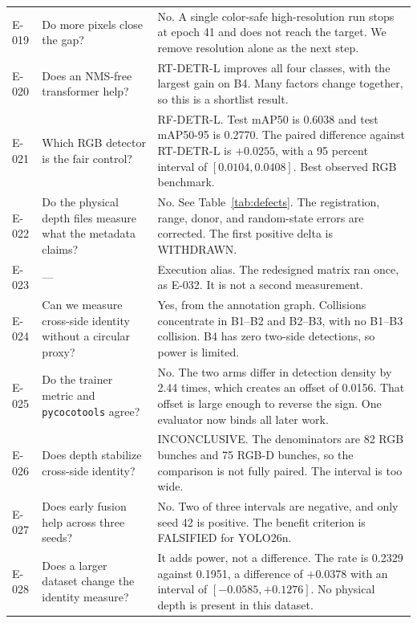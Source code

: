 \documentclass[preprint,12pt]{elsarticle}
\newcommand{\E}[1]{E-#1}
\newcommand{\mAP}{mAP}
\begin{document}
\begin{longtable}{L{0.07\textwidth}L{0.28\textwidth}L{0.55\textwidth}}
\E{019} & Do more pixels close the gap? & No. A single color-safe
high-resolution run stops at epoch 41 and does not reach the target. We remove resolution alone as the
next step.\\

\E{020} & Does an NMS-free transformer help? & RT-DETR-L improves all four
classes, with the largest gain on B4. Many factors change together, so this is a
shortlist result.\\

\E{021} & Which RGB detector is the fair control? & RF-DETR-L. Test \mAP50 is
0.6038 and test \mAP50-95 is 0.2770. The paired difference against RT-DETR-L is
$+0.0255$, with a 95 percent interval of $[0.0104, 0.0408]$. Best observed RGB
benchmark.\\

\E{022} & Do the physical depth files measure what the metadata claims? & No.
See Table~\ref{tab:defects}. The registration, range, donor, and random-state
errors are corrected. The first positive delta is WITHDRAWN.\\

\E{023} & --- & Execution alias. The redesigned matrix ran once, as \E{032}. It
is not a second measurement.\\

\E{024} & Can we measure cross-side identity without a circular proxy? & Yes,
from the annotation graph. Collisions concentrate in B1--B2 and B2--B3, with no
B1--B3 collision. B4 has zero two-side detections, so power is limited.\\

\E{025} & Do the trainer metric and \texttt{pycocotools} agree? & No. The two
arms differ in detection density by 2.44 times, which creates an offset of
0.0156. That offset is large enough to reverse the sign. One evaluator now binds
all later work.\\

\E{026} & Does depth stabilize cross-side identity? & INCONCLUSIVE. The
denominators are 82 RGB bunches and 75 RGB-D bunches, so the comparison is not
fully paired. The interval is too wide.\\

\E{027} & Does early fusion help across three seeds? & No. Two of three
intervals are negative, and only seed 42 is positive. The benefit criterion is
FALSIFIED for YOLO26n.\\

\E{028} & Does a larger dataset change the identity measure? & It adds power,
not a difference. The rate is 0.2329 against 0.1951, a difference of $+0.0378$
with an interval of $[-0.0585, +0.1276]$. No physical depth is present in this
dataset.\\


\end{longtable}
\end{document}
